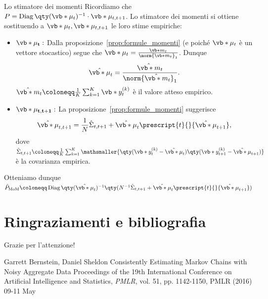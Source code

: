\documentclass[10pt,xcolor={table,dvipsnames}]{beamer} 		%
\theoremstyle{plain}					%
\theoremstyle{definition}
\theoremstyle{remark}
\newcommand{\transpose}[1]{\prescript{t}{}{#1}}
\begin{document}
	\begin{frame}
		{Lo stimatore dei momenti}
		Ricordiamo che $P=\operatorname{Diag}\qty(\vb*{\mu}_t)^{-1}\cdot\vb*{\mu}_{t,t+1}$.
		Lo stimatore dei momenti si ottiene sostituendo a $\vb*{\mu}_t,\vb*{\mu}_{t,t+1}$
		le loro stime empiriche: 
        \begin{itemize}
            \item $\mathbf{\vb*{\mu}_t}:$ Dalla proposizione~\ref{prop:formule_momenti} {\smaller (e poiché $\vb*{\mu}_t$ è un vettore stocastico)} segue che $\vb*{\mu}_t=\frac{\vb*{m}_t}{\norm{\vb*{m}_t}_1}$. Dunque 
            \[
                \hat{\vb*{\mu}}_t=\frac{\hat{\vb*{m}}_t}{\norm{\hat{\vb*{m}}_t}_1}.
            \]
            $\hat{\vb*{m}}_t\coloneqq\frac{1}{K}\sum_{k=1}^K\vb*{y}_t^{(k)}$ è il valore atteso empirico.
            \item $\mathbf{\vb*{\mu}_{t,t+1}}:$ La proposizione~\ref{prop:formule_momenti} suggerisce
            \[
                \hat{\vb*{\mu}}_{t,t+1}=\frac{1}{N}\hat{\Sigma}_{t,t+1}+\hat{\vb*{\mu}}_t\transpose{\hat{\vb*{\mu}}_{t+1}},
            \]
            dove 
            $\hat{\Sigma}_{t,t+1}\coloneqq\frac{1}{K}\sum_{k=1}^K\mathsmaller{ \qty(\vb*{y}_t^{(k)}-\hat{\vb*{\mu}}_t)\qty(\vb*{y}_{t+1}^{(k)}-\hat{\vb*{\mu}}_{t+1})}$ è la covarianza empirica.
        \end{itemize}
        Otteniamo dunque $\hat{P}_{\textup{MoM}}\coloneqq\operatorname{Diag}\qty(\hat{\vb*{\mu}}_t)^{-1}\qty(N^{-1}\hat{\Sigma}_{t,t+1}+\hat{\vb*{\mu}}_t\transpose{\hat{\vb*{\mu}}_{t+1}})$
	\end{frame}











	

    
\section{Ringraziamenti e bibliografia}
    \begin{frame}
        \begin{center}
            \Huge{Grazie per l'attenzione!}
        \end{center}
    \end{frame}

	\begin{frame}{\refname}
		\begin{thebibliography}{9}
			 Garrett Bernstein, Daniel Sheldon
			\newblock Consistently Estimating Markov Chains with Noisy Aggregate Data
			\newblock Proceedings of the 19th International Conference on Artificial Intelligence and Statistics, \emph{PMLR}, vol. 51, pp. 1142-1150, PMLR (2016) 09-11 May

		\end{thebibliography}
	\end{frame}
\end{document}
